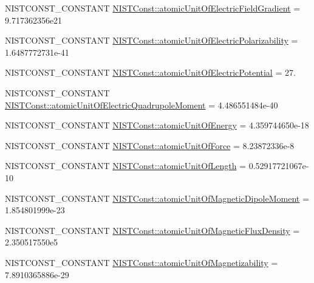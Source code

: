 \begin{DoxyCompactItemize}
\item 
N\+I\+S\+T\+C\+O\+N\+S\+T\+\_\+\+C\+O\+N\+S\+T\+A\+NT \mbox{\hyperlink{group___n_i_s_t_const-_atomic_unit_ga02c36e91d6f95d818656270669d20926}{N\+I\+S\+T\+Const\+::atomic\+Unit\+Of\+Electric\+Field\+Gradient}} = 9.\+717362356e21
\item 
N\+I\+S\+T\+C\+O\+N\+S\+T\+\_\+\+C\+O\+N\+S\+T\+A\+NT \mbox{\hyperlink{group___n_i_s_t_const-_atomic_unit_ga635fe4831055d2787293d19a8134c0c7}{N\+I\+S\+T\+Const\+::atomic\+Unit\+Of\+Electric\+Polarizability}} = 1.\+6487772731e-\/41
\item 
N\+I\+S\+T\+C\+O\+N\+S\+T\+\_\+\+C\+O\+N\+S\+T\+A\+NT \mbox{\hyperlink{group___n_i_s_t_const-_atomic_unit_gaabb37ce172d4f7c491b79ac27db120da}{N\+I\+S\+T\+Const\+::atomic\+Unit\+Of\+Electric\+Potential}} = 27.
\item 
N\+I\+S\+T\+C\+O\+N\+S\+T\+\_\+\+C\+O\+N\+S\+T\+A\+NT \mbox{\hyperlink{group___n_i_s_t_const-_atomic_unit_ga4714cce6077b09c5fd2dbcb3efa95d5b}{N\+I\+S\+T\+Const\+::atomic\+Unit\+Of\+Electric\+Quadrupole\+Moment}} = 4.\+486551484e-\/40
\item 
N\+I\+S\+T\+C\+O\+N\+S\+T\+\_\+\+C\+O\+N\+S\+T\+A\+NT \mbox{\hyperlink{group___n_i_s_t_const-_atomic_unit_gafa7ea08448d60570f5a6f2c6938bc8fc}{N\+I\+S\+T\+Const\+::atomic\+Unit\+Of\+Energy}} = 4.\+359744650e-\/18
\item 
N\+I\+S\+T\+C\+O\+N\+S\+T\+\_\+\+C\+O\+N\+S\+T\+A\+NT \mbox{\hyperlink{group___n_i_s_t_const-_atomic_unit_gaf1da533cf2e7a57f1b0b87613ddea807}{N\+I\+S\+T\+Const\+::atomic\+Unit\+Of\+Force}} = 8.\+23872336e-\/8
\item 
N\+I\+S\+T\+C\+O\+N\+S\+T\+\_\+\+C\+O\+N\+S\+T\+A\+NT \mbox{\hyperlink{group___n_i_s_t_const-_atomic_unit_ga2611c2902279953d3d6a18cfd1dfce3e}{N\+I\+S\+T\+Const\+::atomic\+Unit\+Of\+Length}} = 0.\+52917721067e-\/10
\item 
N\+I\+S\+T\+C\+O\+N\+S\+T\+\_\+\+C\+O\+N\+S\+T\+A\+NT \mbox{\hyperlink{group___n_i_s_t_const-_atomic_unit_gacc6b0608f4456d2fb880dc295b852433}{N\+I\+S\+T\+Const\+::atomic\+Unit\+Of\+Magnetic\+Dipole\+Moment}} = 1.\+854801999e-\/23
\item 
N\+I\+S\+T\+C\+O\+N\+S\+T\+\_\+\+C\+O\+N\+S\+T\+A\+NT \mbox{\hyperlink{group___n_i_s_t_const-_atomic_unit_gafc19eaca8ac811b061e8630bd3203930}{N\+I\+S\+T\+Const\+::atomic\+Unit\+Of\+Magnetic\+Flux\+Density}} = 2.\+350517550e5
\item 
N\+I\+S\+T\+C\+O\+N\+S\+T\+\_\+\+C\+O\+N\+S\+T\+A\+NT \mbox{\hyperlink{group___n_i_s_t_const-_atomic_unit_ga20e7e2a56b476e5730ce9c59a4efc946}{N\+I\+S\+T\+Const\+::atomic\+Unit\+Of\+Magnetizability}} = 7.\+8910365886e-\/29

\end{DoxyCompactItemize}
